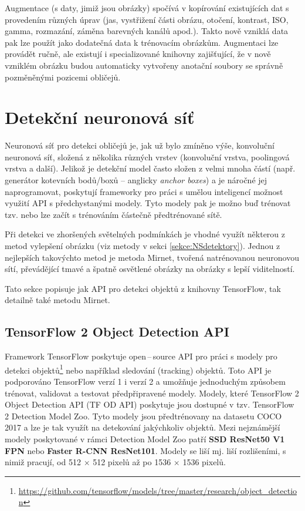 Augmentace (s daty, jimiž jsou obrázky) spočívá v kopírování existujících dat s provedením různých úprav (jas, vystřižení části obrázu, otočení, kontrast, ISO, gamma, rozmazání, záměna barevných kanálů apod.). Takto nově vzniklá data pak lze použít jako dodatečná data k trénovacím obrázkům. Augmentaci lze provádět ručně, ale existují i specializované knihovny zajišťující, že v nově vzniklém obrázku budou automaticky vytvořeny anotační soubory se správně pozměněnými pozicemi obličejů.

\section{Detekční neuronová síť}
Neuronová síť pro detekci obličejů je, jak už bylo zmíněno výše, konvoluční neuronová síť, složená z několika různých vrstev (konvoluční vrstva, poolingová vrstva a další). Jelikož je detekční model často složen z velmi mnoha částí (např. generátor kotevních bodů/boxů -- anglicky \emph{anchor boxes}) a je náročné jej naprogramovat, poskytují frameworky pro práci s umělou inteligencí možnost využití API s předchystanými modely. Tyto modely pak je možno buď trénovat tzv.  nebo lze začít s trénováním částečně předtrénované sítě.

Při detekci ve zhoršených světelných podmínkách je vhodné využít některou z metod vylepšení obrázku (viz metody v sekci \ref{sekce:NSdetektory}). Jednou z nejlepších takovýchto metod je metoda Mirnet, tvořená natrénovanou neuronovou sítí, převádějící tmavé a špatně osvětlené obrázky na obrázky s lepší viditelností.

Tato sekce popisuje jak API pro detekci objektů z knihovny TensorFlow, tak detailně také metodu Mirnet.

\subsection*{TensorFlow 2 Object Detection API}
Framework TensorFlow poskytuje open\,--\,source API pro práci s modely pro detekci objektů\footnote{\url{https://github.com/tensorflow/models/tree/master/research/object_detection}} nebo například sledování (tracking) objektů. Toto API je podporováno TensorFlow verzí 1 i verzí 2 a umožňuje jednoduchým způsobem trénovat, validovat a testovat předpřipravené modely. Modely, které TensorFlow 2 Object Detection API (TF OD API) poskytuje jsou dostupné v tzv. TensorFlow 2 Detection Model Zoo. Tyto modely jsou předtrénovany na datasetu COCO 2017 a lze je tak využít na detekování jakýchkoliv objektů. Mezi nejznámější modely poskytované v rámci Detection Model Zoo patří \textbf{SSD ResNet50 V1 FPN} nebo \textbf{Faster R-CNN ResNet101}. Modely se liší mj. liší rozlišeními, s nimiž pracují, od 512 $\times$ 512 pixelů až po 1536 $\times$ 1536 pixelů.

